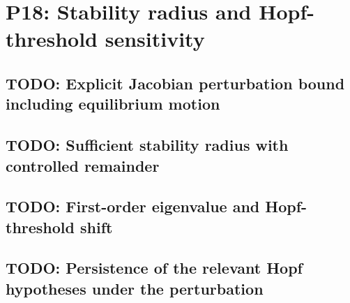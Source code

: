 
\section{P18: Stability radius and Hopf-threshold sensitivity}
\label{sec:P18}

\subsection{TODO: Explicit Jacobian perturbation bound including equilibrium motion}
\label{slot:P18-1}

\subsection{TODO: Sufficient stability radius with controlled remainder}
\label{slot:P18-2}

\subsection{TODO: First-order eigenvalue and Hopf-threshold shift}
\label{slot:P18-3}

\subsection{TODO: Persistence of the relevant Hopf hypotheses under the perturbation}
\label{slot:P18-4}
